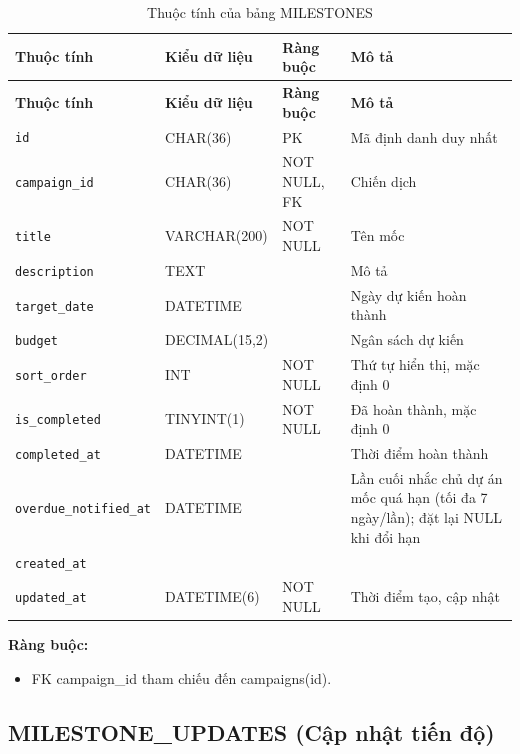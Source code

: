 {\small
\begin{longtable}{|P{3.2cm}|P{2.8cm}|P{2.2cm}|p{5.4cm}|}
    \caption{Thuộc tính của bảng MILESTONES}
    \label{tab:milestones} \\
    \hline
    \textbf{Thuộc tính} & \textbf{Kiểu dữ liệu} & \textbf{Ràng buộc} & \textbf{Mô tả} \\
    \hline
    \endfirsthead
    \hline
    \textbf{Thuộc tính} & \textbf{Kiểu dữ liệu} & \textbf{Ràng buộc} & \textbf{Mô tả} \\
    \hline
    \endhead

    \texttt{id} & CHAR(36) & PK & Mã định danh duy nhất \\
    \hline
    \texttt{campaign\_\allowbreak{}id} & CHAR(36) & NOT NULL, FK & Chiến dịch \\
    \hline
    \texttt{title} & VARCHAR(200) & NOT NULL & Tên mốc \\
    \hline
    \texttt{description} & TEXT &  & Mô tả \\
    \hline
    \texttt{target\_\allowbreak{}date} & DATETIME &  & Ngày dự kiến hoàn thành \\
    \hline
    \texttt{budget} & DECIMAL(15,2) &  & Ngân sách dự kiến \\
    \hline
    \texttt{sort\_\allowbreak{}order} & INT & NOT NULL & Thứ tự hiển thị, mặc định 0 \\
    \hline
    \texttt{is\_\allowbreak{}completed} & TINYINT(1) & NOT NULL & Đã hoàn thành, mặc định 0 \\
    \hline
    \texttt{completed\_\allowbreak{}at} & DATETIME &  & Thời điểm hoàn thành \\
    \hline
    \texttt{overdue\_\allowbreak{}notified\_\allowbreak{}at} & DATETIME &  & Lần cuối nhắc chủ dự án mốc quá hạn (tối đa 7 ngày/lần); đặt lại NULL khi đổi hạn \\
    \hline
    \texttt{created\_\allowbreak{}at} &  &  &  \\
    \hline
    \texttt{updated\_\allowbreak{}at} & DATETIME(6) & NOT NULL & Thời điểm tạo, cập nhật \\
    \hline
\end{longtable}
}

\textbf{Ràng buộc:}
\begin{itemize}
    \item FK campaign\_\allowbreak{}id tham chiếu đến campaigns(id).
\end{itemize}

\subsection{MILESTONE\_\allowbreak{}UPDATES (Cập nhật tiến độ)}

